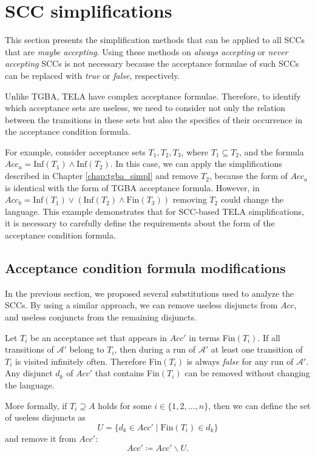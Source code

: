 \documentclass[
  digital, %
  twoside, %
  table,   %
  lof,     %
  lot,     %
]{fithesis3}
\begin{document}
\section{SCC simplifications}
This section presents the simplification methods that can be applied to all SCCs that are \emph{maybe accepting}. Using these methods on \emph{always accepting} or \emph{never accepting} SCCs is not necessary because the acceptance formulae of such SCCs can be replaced with \emph{true} or \emph{false}, respectively. 

Unlike TGBA, TELA have complex acceptance formulae. Therefore, to identify which acceptance sets are useless, we need to consider not only the relation between the transitions in these sets but also the specifics of their occurrence in the acceptance condition formula. 

For example, consider acceptance sets $T_1, T_2, T_3$, where $T_1 \subseteq T_2$, and the formula $Acc_a = \text{Inf}(T_1) \wedge \text{Inf}(T_2)$. In this case, we can apply the simplifications described in Chapter \ref{chap:tgba_simpl} and remove $T_2$, because the form of $Acc_a$ is identical with the form of TGBA acceptance formula. However, in $Acc_b = \text{Inf}(T_1) \vee (\text{Inf}(T_2) \wedge \text{Fin}(T_3))$ removing $T_2$ could change the language. This example demonstrates that for SCC-based TELA simplifications, it is necessary to carefully define the requirements about the form of the acceptance condition formula.

\subsection{Acceptance condition formula modifications}
In the previous section, we proposed several substitutions used to analyze the SCCs. By using a similar approach, we can remove useless disjuncts from $Acc$, and useless conjuncts from the remaining disjuncts.

Let $T_i$ be an acceptance set that appears in $Acc'$ in terms Fin$(T_i)$. If all transitions of $\mathcal{A'}$ belong to $T_i$, then during a run of $\mathcal{A'}$ at least one transition of $T_i$ is visited infinitely often. Therefore Fin$(T_i)$ is always \emph{false} for any run of $\mathcal{A'}$. Any disjunct $d_k$ of $Acc'$ that contains Fin$(T_i)$ can be removed without changing the language.

More formally, if $T_i \supseteq A$ holds for some $i \in \{1,2, \dots, n\}$, then we can define the set of useless disjuncts as
\begin{equation*}
  U = \{d_k \in Acc' \mid \text{Fin}(T_i) \in d_k \}
\end{equation*}
and remove it from $Acc'$:
\begin{equation*}
  Acc' \coloneqq Acc' \smallsetminus U.
\end{equation*}
\end{document}

